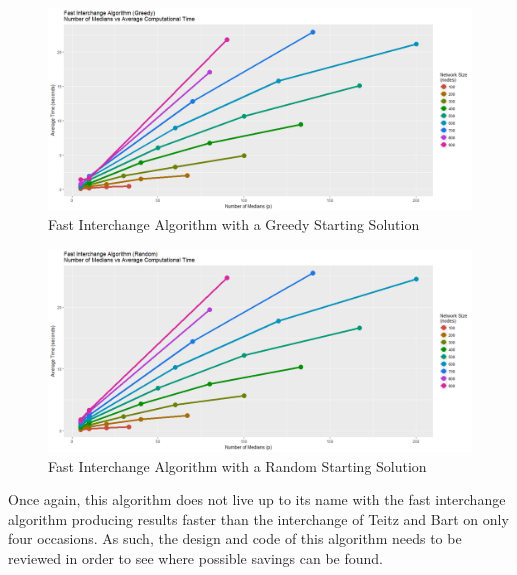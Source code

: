 \documentclass[11pt]{article}
\begin{document}
	\begin{figure}[H]
		\begin{center}
			\includegraphics[width=15cm]{FintGreedy.png}
			\caption{Fast Interchange Algorithm with a Greedy Starting Solution}
			\label{FintGreedy.median.time}
		\end{center}
	\end{figure}
	
	\begin{figure}[H]
		\begin{center}
			\includegraphics[width=15cm]{FintRand.png}
			\caption{Fast Interchange Algorithm with a Random Starting Solution}
			\label{FintRand.median.time}
		\end{center}
	\end{figure}

	Once again, this algorithm does not live up to its name with the fast interchange algorithm producing results faster than the interchange of Teitz and Bart on only four occasions.  As such, the design and code of this algorithm needs to be reviewed in order to see where possible savings can be found.
\end{document}
